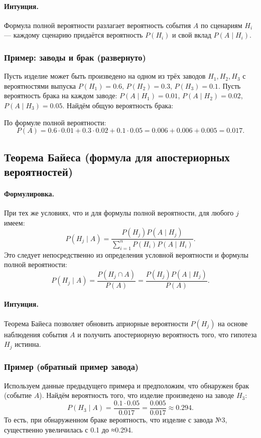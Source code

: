 \paragraph{Интуиция.} Формула полной вероятности разлагает вероятность события $A$ по сценариям $H_i$ — каждому сценарию придаётся вероятность $P(H_i)$ и свой вклад $P(A\mid H_i)$.

\subsubsection*{Пример: заводы и брак (развернуто)}
Пусть изделие может быть произведено на одном из трёх заводов $H_1,H_2,H_3$ с вероятностями выпуска $P(H_1)=0.6$, $P(H_2)=0.3$, $P(H_3)=0.1$. Пусть вероятность брака на каждом заводе: $P(A\mid H_1)=0.01$, $P(A\mid H_2)=0.02$, $P(A\mid H_3)=0.05$. Найдём общую вероятность брака:

По формуле полной вероятности:
\[
P(A)=0.6\cdot0.01 + 0.3\cdot0.02 + 0.1\cdot0.05 = 0.006 + 0.006 + 0.005 = 0.017.
\]

\subsection{Теорема Байеса (формула для апостериорных вероятностей)}
\paragraph{Формулировка.} При тех же условиях, что и для формулы полной вероятности, для любого $j$ имеем:
\[
P(H_j\mid A) = \frac{P(H_j)P(A\mid H_j)}{\sum_{i=1}^n P(H_i)P(A\mid H_i)}.
\]
Это следует непосредственно из определения условной вероятности и формулы полной вероятности:
\[
P(H_j\mid A) = \frac{P(H_j\cap A)}{P(A)} = \frac{P(H_j)P(A\mid H_j)}{P(A)}.
\]

\paragraph{Интуиция.} Теорема Байеса позволяет обновить априорные вероятности $P(H_j)$ на основе наблюдения события $A$ и получить апостериорную вероятность того, что гипотеза $H_j$ истинна.

\subsubsection*{Пример (обратный пример завода)}
Используем данные предыдущего примера и предположим, что обнаружен брак (событие $A$). Найдём вероятность того, что изделие произведено на заводе $H_3$:
\[
P(H_3\mid A) = \frac{0.1\cdot0.05}{0.017} = \frac{0.005}{0.017} \approx 0.294.
\]
То есть, при обнаруженном браке вероятность, что изделие с завода №3, существенно увеличилась с 0.1 до ≈0.294.

